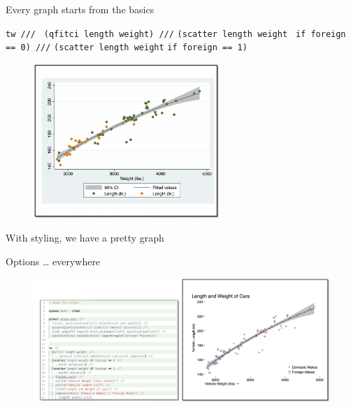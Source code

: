 \documentclass[aspectratio=169]{beamer}
\begin{document}
\begin{frame}{Every graph starts from the basics}
	\begin{multicols}{2}	
		
		\leavevmode 	\newline  \texttt{tw ///}
		 	\newline  \texttt{ (qfitci length weight) ///}
		 	\newline  \texttt{(scatter length weight} 
		 	\newline  \texttt{ if foreign == 0) ///}
		 	\newline  \texttt{(scatter length weight} 
		 	\newline  \texttt{if foreign == 1) }
		
		\begin{figure}
			\centering
			\includegraphics[width=70mm]{img/Basics}
		\end{figure}
		
	\end{multicols}
\end{frame}


\begin{frame}{With styling, we have a pretty graph}
		
	Options … everywhere
		
		\begin{figure}
			\centering
			\includegraphics[width=135mm]{img/Styling}
		\end{figure}
		
\end{frame}
\end{document}
